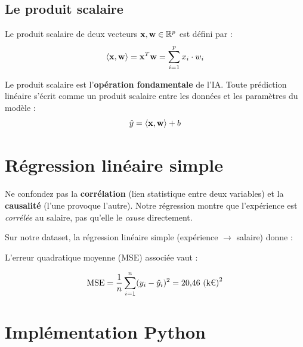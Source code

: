 \subsection{Le produit scalaire}

\begin{definitionbox}
    Le produit scalaire de deux vecteurs $\mathbf{x}, \mathbf{w} \in \mathbb{R}^p$ est défini par :
    \[
        \langle \mathbf{x}, \mathbf{w} \rangle = \mathbf{x}^T \mathbf{w} = \sum_{i=1}^{p} x_i \cdot w_i
    \]
\end{definitionbox}

\begin{retenirbox}
    Le produit scalaire est l'\textbf{opération fondamentale} de l'IA. Toute prédiction linéaire s'écrit comme un produit scalaire entre les données et les paramètres du modèle :
    \[
        \hat{y} = \langle \mathbf{x}, \mathbf{w} \rangle + b
    \]
\end{retenirbox}

\section{Régression linéaire simple}

\begin{attentionbox}
    Ne confondez pas la \textbf{corrélation} (lien statistique entre deux variables) et la \textbf{causalité} (l'une provoque l'autre). Notre régression montre que l'expérience est \emph{corrélée} au salaire, pas qu'elle le \emph{cause} directement.
\end{attentionbox}

Sur notre dataset, la régression linéaire simple (expérience $\to$ salaire) donne :


L'erreur quadratique moyenne (MSE) associée vaut :

\[
    \text{MSE} = \frac{1}{n} \sum_{i=1}^{n} (y_i - \yhat_i)^2 = 20{,}46 \text{ (k\texteuro)}^2
\]

\section{Implémentation Python}

